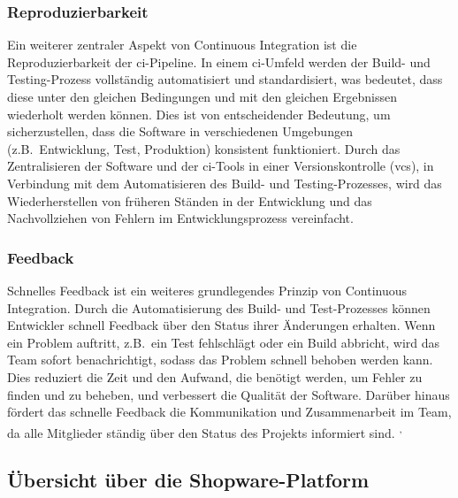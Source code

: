 \subsubsection{Reproduzierbarkeit}

Ein weiterer zentraler Aspekt von Continuous Integration ist die Reproduzierbarkeit der \acrshort{ci}-Pipeline.
In einem \acrshort{ci}-Umfeld werden der Build- und Testing-Prozess vollständig automatisiert und standardisiert, was
bedeutet, dass diese unter den gleichen Bedingungen und mit den gleichen Ergebnissen wiederholt werden können.
Dies ist von entscheidender Bedeutung, um sicherzustellen, dass die Software in verschiedenen Umgebungen
(z.B.\ Entwicklung, Test, Produktion) konsistent funktioniert.
Durch das Zentralisieren der Software und der \acrshort{ci}-Tools in einer Versionskontrolle (\acrshort{vcs}), in
Verbindung mit dem Automatisieren des Build- und Testing-Prozesses, wird das Wiederherstellen von früheren Ständen in
der Entwicklung und das Nachvollziehen von Fehlern im Entwicklungsprozess vereinfacht.

\subsubsection{Feedback}

Schnelles Feedback ist ein weiteres grundlegendes Prinzip von Continuous Integration.
Durch die Automatisierung des Build- und Test-Prozesses können Entwickler schnell Feedback über den Status ihrer
Änderungen erhalten.
Wenn ein Problem auftritt, z.B.\ ein Test fehlschlägt oder ein Build abbricht, wird das Team sofort benachrichtigt,
sodass das Problem schnell behoben werden kann.
Dies reduziert die Zeit und den Aufwand, die benötigt werden, um Fehler zu finden und zu beheben, und verbessert die
Qualität der Software.
Darüber hinaus fördert das schnelle Feedback die Kommunikation und Zusammenarbeit im Team, da alle Mitglieder ständig
über den Status des Projekts informiert sind.
\textsuperscript{,}

\subsection{Übersicht über die Shopware-Platform} \label{subsec:02-background-3}

